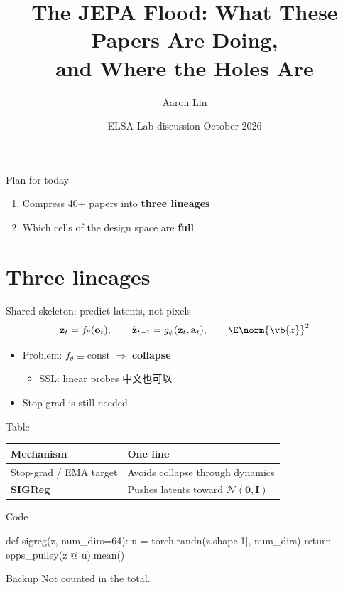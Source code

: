 \documentclass[aspectratio=169,11pt]{beamer}
\title{The JEPA Flood: What These Papers Are Doing,\\and Where the Holes Are}
\author{Aaron Lin}
\date{ELSA Lab discussion \quad October 2026}
\begin{document}
\begin{frame}\titlepage\end{frame}

\begin{frame}{Plan for today}
  \begin{enumerate}
    \item Compress 40+ papers into \textbf{three lineages}
    \item Which cells of the design space are \textbf{full}
  \end{enumerate}
  \vspace{1em}
\end{frame}

\section{Three lineages}
\begin{frame}{Shared skeleton: predict latents, not pixels}
  \[
    \mathbf{z}_t = f_\theta(\mathbf{o}_t), \qquad
    \hat{\mathbf{z}}_{t+1} = g_\phi(\mathbf{z}_t, \mathbf{a}_t), \qquad
    \E\norm{\vb{z}}^2
  \]
  \begin{itemize}
    \item Problem: $f_\theta \equiv \text{const}$ $\Rightarrow$ \textbf{collapse}
      \begin{itemize}\item SSL: linear probes 中文也可以\end{itemize}
    \item \alert{Stop-grad is still needed}
  \end{itemize}
\end{frame}

\begin{frame}{Table}
\small
\begin{tabularx}{\linewidth}{@{}l Y@{}}
\toprule
Mechanism & One line \\
\midrule
Stop-grad / EMA target & Avoids collapse through dynamics \\
\textbf{SIGReg} & Pushes latents toward $\mathcal{N}(\mathbf{0},\mathbf{I})$ \\
\bottomrule
\end{tabularx}
\end{frame}
\begin{frame}[fragile]{Code}
\begin{codeblock}[lang=Python, title=sigreg.py]
def sigreg(z, num_dirs=64):
    u = torch.randn(z.shape[1], num_dirs)
    return epps_pulley(z @ u).mean()
\end{codeblock}
\end{frame}
\appendix
{}
\begin{frame}{Backup}
  Not counted in the total.
\end{frame}
\end{document}
